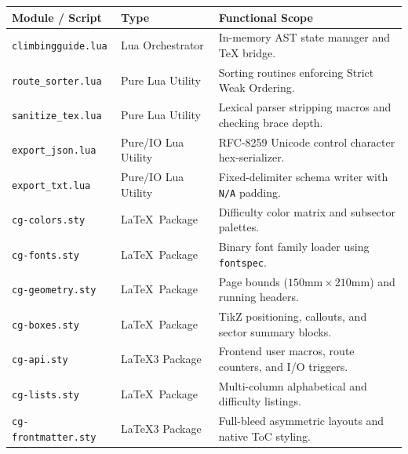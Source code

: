 \noindent
{\small
\begin{tabularx}{\linewidth}{@{}llX@{}}
\toprule
\textbf{Module / Script} & \textbf{Type} & \textbf{Functional Scope} \\
\midrule
\texttt{climbingguide.lua} & Lua Orchestrator & In-memory AST state manager and TeX bridge. \\
\texttt{route\_sorter.lua} & Pure Lua Utility & Sorting routines enforcing Strict Weak Ordering. \\
\texttt{sanitize\_tex.lua} & Pure Lua Utility & Lexical parser stripping macros and checking brace depth. \\
\texttt{export\_json.lua} & Pure/IO Lua Utility & RFC-8259 Unicode control character hex-serializer. \\
\texttt{export\_txt.lua} & Pure/IO Lua Utility & Fixed-delimiter schema writer with \texttt{N/A} padding. \\
\texttt{cg-colors.sty} & \LaTeX\ Package & Difficulty color matrix and subsector palettes. \\
\texttt{cg-fonts.sty} & \LaTeX\ Package & Binary font family loader using \texttt{fontspec}. \\
\texttt{cg-geometry.sty} & \LaTeX\ Package & Page bounds ($150\text{mm} \times 210\text{mm}$) and running headers. \\
\texttt{cg-boxes.sty} & \LaTeX\ Package & TikZ positioning, callouts, and sector summary blocks. \\
\texttt{cg-api.sty} & \LaTeX3 Package & Frontend user macros, route counters, and I/O triggers. \\
\texttt{cg-lists.sty} & \LaTeX\ Package & Multi-column alphabetical and difficulty listings. \\
\texttt{cg-frontmatter.sty} & \LaTeX3 Package & Full-bleed asymmetric layouts and native ToC styling. \\
\bottomrule
\end{tabularx}
}

